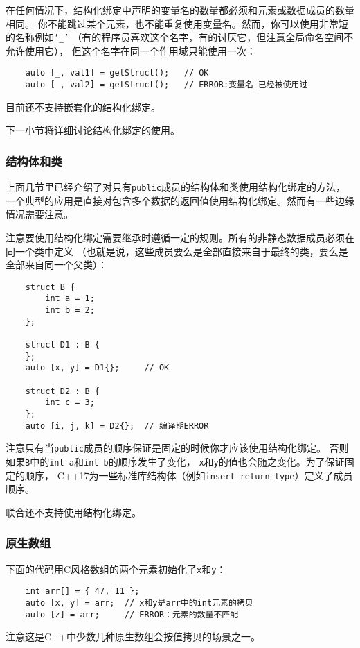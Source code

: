 在任何情况下，结构化绑定中声明的变量名的数量都必须和元素或数据成员的数量相同。
你不能跳过某个元素，也不能重复使用变量名。然而，你可以使用非常短的名称例如\texttt{'\_'}
（有的程序员喜欢这个名字，有的讨厌它，但注意全局命名空间不允许使用它），
但这个名字在同一个作用域只能使用一次：
\begin{lstlisting}
    auto [_, val1] = getStruct();   // OK
    auto [_, val2] = getStruct();   // ERROR:变量名_已经被使用过
\end{lstlisting}
目前还不支持嵌套化的结构化绑定。

下一小节将详细讨论结构化绑定的使用。

\subsubsection{结构体和类}
上面几节里已经介绍了对只有\texttt{public}成员的结构体和类使用结构化绑定的方法，
一个典型的应用是直接对包含多个数据的返回值使用结构化绑定。然而有一些边缘情况需要注意。

注意要使用结构化绑定需要继承时遵循一定的规则。所有的非静态数据成员必须在同一个类中定义
（也就是说，这些成员要么是全部直接来自于最终的类，要么是全部来自同一个父类）：
\begin{lstlisting}
    struct B {
        int a = 1;
        int b = 2;
    };

    struct D1 : B {
    };
    auto [x, y] = D1{};     // OK

    struct D2 : B {
        int c = 3;
    };
    auto [i, j, k] = D2{};  // 编译期ERROR
\end{lstlisting}
注意只有当\texttt{public}成员的顺序保证是固定的时候你才应该使用结构化绑定。
否则如果\texttt{B}中的\texttt{int a}和\texttt{int b}的顺序发生了变化，
\texttt{x}和\texttt{y}的值也会随之变化。为了保证固定的顺序，
C++17为一些标准库结构体（例如\texttt{insert\_return\_type}）定义了成员顺序。

联合还不支持使用结构化绑定。

\subsubsection{原生数组}
下面的代码用C风格数组的两个元素初始化了\texttt{x}和\texttt{y}：
\begin{lstlisting}
    int arr[] = { 47, 11 };
    auto [x, y] = arr;  // x和y是arr中的int元素的拷贝
    auto [z] = arr;     // ERROR：元素的数量不匹配
\end{lstlisting}
注意这是C++中少数几种原生数组会按值拷贝的场景之一。

